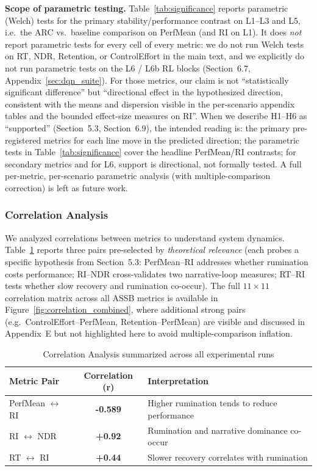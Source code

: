 \documentclass{article}
\begin{document}
\textbf{Scope of parametric testing.} Table~\ref{tab:significance} reports parametric (Welch) tests for the primary stability/performance contrast on L1--L3 and L5, i.e.\ the ARC vs.\ baseline comparison on PerfMean (and RI on L1). It does \emph{not} report parametric tests for every cell of every metric: we do not run Welch tests on RT, NDR, Retention, or ControlEffort in the main text, and we explicitly do not run parametric tests on the L6 / L6b RL blocks (Section~6.7, Appendix~\ref{sec:dqn_suite}). For those metrics, our claim is not ``statistically significant difference'' but ``directional effect in the hypothesized direction, consistent with the means and dispersion visible in the per-scenario appendix tables and the bounded effect-size measures on RI''. When we describe H1--H6 as ``supported'' (Section~5.3, Section~6.9), the intended reading is: the primary pre-registered metrics for each line move in the predicted direction; the parametric tests in Table~\ref{tab:significance} cover the headline PerfMean/RI contrasts; for secondary metrics and for L6, support is directional, not formally tested. A full per-metric, per-scenario parametric analysis (with multiple-comparison correction) is left as future work.

\subsubsection{Correlation Analysis}
We analyzed correlations between metrics to understand system dynamics. Table~\ref{tab:correlations} reports three pairs pre-selected by \emph{theoretical relevance} (each probes a specific hypothesis from Section~5.3: PerfMean--RI addresses whether rumination costs performance; RI--NDR cross-validates two narrative-loop measures; RT--RI tests whether slow recovery and rumination co-occur). The full $11\times 11$ correlation matrix across all ASSB metrics is available in Figure~\ref{fig:correlation_combined}, where additional strong pairs (e.g.\ ControlEffort--PerfMean, Retention--PerfMean) are visible and discussed in Appendix~E but not highlighted here to avoid multiple-comparison inflation.

\begin{table}[htbp]
\centering
\caption{Correlation Analysis summarized across all experimental runs}
\label{tab:correlations}
\begin{tabular}{@{}lcl@{}}
\toprule
Metric Pair & Correlation (r) & Interpretation \\ \midrule
PerfMean $\leftrightarrow$ RI & \textbf{-0.589} & Higher rumination tends to reduce performance \\
RI $\leftrightarrow$ NDR & \textbf{+0.92} & Rumination and narrative dominance co-occur \\
RT $\leftrightarrow$ RI & \textbf{+0.44} & Slower recovery correlates with rumination \\ \bottomrule
\end{tabular}
\end{table}
\end{document}
